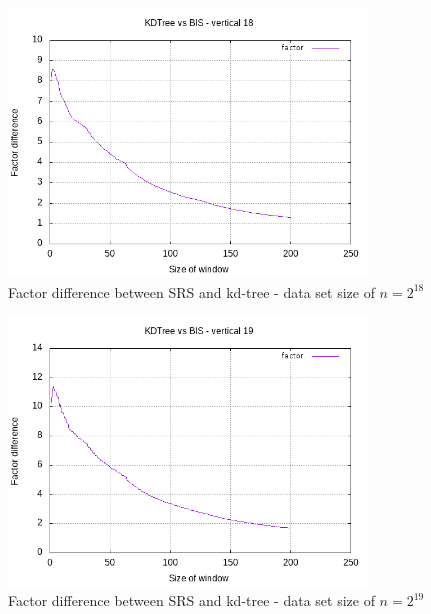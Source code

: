 \begin{figure}[h]
    \centering
    \includegraphics[width = 0.85\textwidth]{pictures/analysis/smalls/vert_fac_18.png}
    \caption{Factor difference between SRS and kd-tree - data set size of $n=2^{18}$}\label{fig:small_vert_fac_18}
\end{figure}

\begin{figure}[h]
    \centering
    \includegraphics[width = 0.85\textwidth]{pictures/analysis/smalls/vert_fac_19.png}
    \caption{Factor difference between SRS and kd-tree - data set size of $n=2^{19}$}\label{fig:small_vert_fac_19}
\end{figure}

